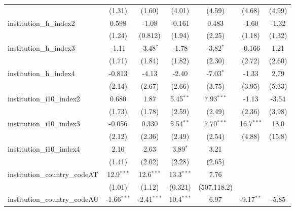 \begin{tabular}{lcccccc}
                                         & (1.31)        & (1.60)        & (4.01)        & (4.59)       & (4.68)        & (4.99)\\   
   institution\_h\_index2                & 0.598         & -1.08         & -0.161        & 0.483        & -1.60         & -1.32\\   
                                         & (1.24)        & (0.812)       & (1.94)        & (2.25)       & (1.18)        & (1.32)\\   
   institution\_h\_index3                & -1.11         & -3.48$^{*}$   & -1.78         & -3.82$^{*}$  & -0.166        & 1.21\\   
                                         & (1.71)        & (1.84)        & (1.82)        & (2.30)       & (2.72)        & (2.60)\\   
   institution\_h\_index4                & -0.813        & -4.13         & -2.40         & -7.03$^{*}$  & -1.33         & 2.79\\   
                                         & (2.14)        & (2.67)        & (2.66)        & (3.75)       & (3.95)        & (5.33)\\   
   institution\_i10\_index2              & 0.680         & 1.87          & 5.45$^{**}$   & 7.93$^{***}$ & -1.13         & -3.54\\   
                                         & (1.73)        & (1.78)        & (2.59)        & (2.49)       & (2.36)        & (3.98)\\   
   institution\_i10\_index3              & -0.056        & 0.330         & 5.54$^{**}$   & 7.70$^{***}$ & 16.7$^{***}$  & 18.0\\   
                                         & (2.12)        & (2.36)        & (2.49)        & (2.54)       & (4.88)        & (15.8)\\   
   institution\_i10\_index4              & 2.10          & 2.63          & 3.89$^{*}$    & 3.21         &               &   \\   
                                         & (1.41)        & (2.02)        & (2.28)        & (2.65)       &               &   \\   
   institution\_country\_codeAT          & 12.9$^{***}$  & 12.6$^{***}$  & 13.3$^{***}$  & 7.76         &               &   \\   
                                         & (1.01)        & (1.12)        & (0.321)       & (507,118.2)  &               &   \\   
   institution\_country\_codeAU          & -1.66$^{***}$ & -2.41$^{***}$ & 10.4$^{***}$  & 6.97         & -9.17$^{**}$  & -5.85\\   

\end{tabular}
